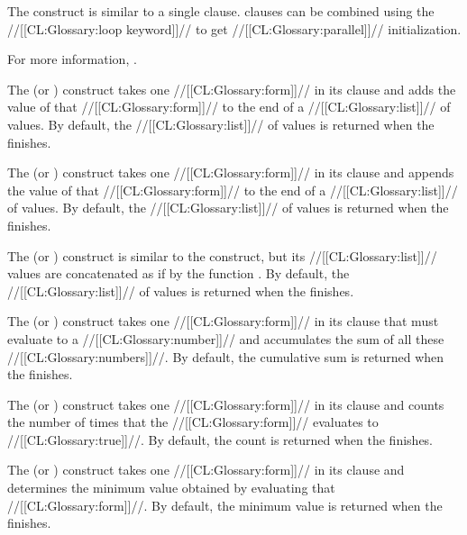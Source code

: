 The  construct is similar to a single  clause.
 clauses can be combined using the //[[CL:Glossary:loop keyword]]// 
to get //[[CL:Glossary:parallel]]// initialization.






For more information, \seesection\LOOPVarInitAndStep.

\endsubsubsubsection%

 
The  (or ) construct
takes one //[[CL:Glossary:form]]// in its clause
and adds the value of that //[[CL:Glossary:form]]// to the end of a //[[CL:Glossary:list]]// 
of values.  By default, the //[[CL:Glossary:list]]// of values is returned 
when the  finishes.
 
The  (or ) construct 
takes one //[[CL:Glossary:form]]// in its clause
and appends the value of that //[[CL:Glossary:form]]// to the end of a //[[CL:Glossary:list]]//
of values.  By default, the //[[CL:Glossary:list]]// of values is returned when the 
 finishes.
 
The  (or ) construct 
is similar to the  construct,  
but its //[[CL:Glossary:list]]// values are concatenated as if by the function
.  By default, the //[[CL:Glossary:list]]// of values is returned when 
the  finishes.
 
The  (or ) construct 
takes one //[[CL:Glossary:form]]// in its clause 
that must evaluate to a //[[CL:Glossary:number]]// and accumulates the sum of all these
//[[CL:Glossary:numbers]]//.  By default, the cumulative sum is returned when the
 finishes.
 
The  (or ) construct 
takes one //[[CL:Glossary:form]]// in its clause 
and counts the number of times that the //[[CL:Glossary:form]]// evaluates to //[[CL:Glossary:true]]//.
By default, the count is returned when the  finishes.
 
The  (or ) construct
takes one //[[CL:Glossary:form]]// in its clause 
and determines the minimum value obtained by evaluating that //[[CL:Glossary:form]]//.
By default, the minimum value is returned when the  finishes.
 
